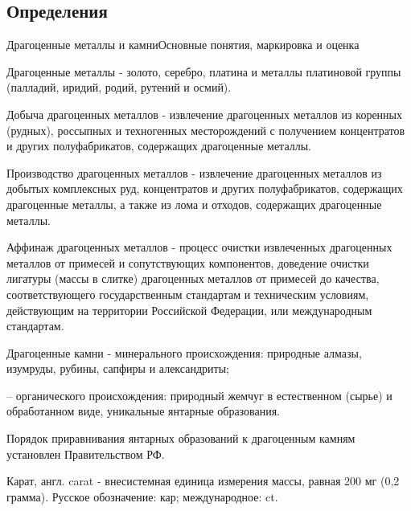 \documentclass[_Banking_p3.tex]{subfiles}
\begin{document}
\subsection{Определения}
\begin{frame} [ allowframebreaks]{Драгоценные металлы и камни}{Основные понятия, маркировка и оценка}
\begin{block}{ Драгоценные металлы}
\quad
- золото, серебро, платина и металлы платиновой группы (палладий, иридий, родий, рутений и осмий).
\end{block}
\pagebreak

\begin{block}{Добыча драгоценных металлов }
\quad
- извлечение драгоценных металлов из коренных (рудных), россыпных и техногенных месторождений с получением концентратов и других полуфабрикатов, содержащих драгоценные металлы.
\end{block}
\pagebreak

\begin{block}{Производство драгоценных металлов }
\quad
- извлечение драгоценных металлов из добытых комплексных руд, концентратов и других полуфабрикатов, содержащих драгоценные металлы, а также из лома и отходов, содержащих драгоценные металлы.
\end{block}
\pagebreak

\begin{block}{Аффинаж драгоценных металлов}
\quad
- процесс очистки извлеченных драгоценных металлов от примесей и сопутствующих компонентов, доведение очистки лигатуры (массы в слитке) драгоценных металлов от примесей до качества, соответствующего государственным стандартам и техническим условиям, действующим на территории Российской Федерации, или международным стандартам.
\end{block}
\pagebreak

\begin{block}{Драгоценные камни}
\quad
- минерального происхождения: природные алмазы, изумруды, рубины, сапфиры и александриты;

\quad
– органического происхождения: природный жемчуг в естественном (сырье) и обработанном виде, уникальные янтарные образования. 
\end{block}
Порядок приравнивания янтарных образований к драгоценным камням установлен Правительством РФ.

\begin{block}{Карат, англ. carat}
\quad
- внесистемная единица измерения массы, равная 200 мг (0,2 грамма). Русское обозначение: кар; международное: ct.
\end{block}
\end{frame}
\end{document}
